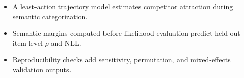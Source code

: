 \begin{itemize}
\item A least-action trajectory model estimates competitor attraction during semantic categorization.
\item Semantic margins computed before likelihood evaluation predict held-out item-level $\rho$ and NLL.
\item Reproducibility checks add sensitivity, permutation, and mixed-effects validation outputs.
\end{itemize}
